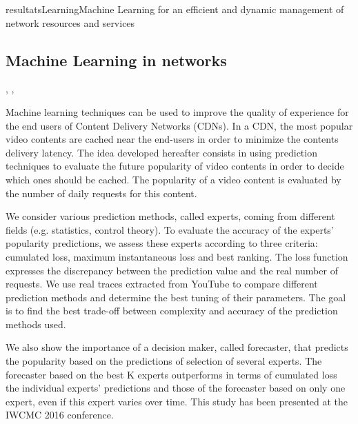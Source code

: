 \documentclass{ra2016}
\begin{document}
\begin{module}{resultats}{Learning}{Machine Learning for an efficient and dynamic management of network resources and services}

\subsection{Machine Learning in networks}
\begin{participants}
,
,
\end{participants}

Machine learning techniques can be used to improve the quality of experience for the end users of Content Delivery Networks (CDNs). In a CDN, the most popular video contents are cached near the end-users in order to minimize the contents delivery latency. The idea developed hereafter consists in using prediction techniques to evaluate the future popularity of video contents in order to decide which ones should be cached. The popularity of a video content is evaluated by the number of daily requests for this content.

We consider various prediction methods, called experts, coming from different fields (e.g. statistics, control theory). To evaluate the accuracy of the experts' popularity predictions, we assess these experts according to three criteria: cumulated loss, maximum instantaneous loss and best ranking. The loss function expresses the discrepancy between the prediction value and the real number of requests. We use real traces extracted from YouTube to compare different prediction methods and determine the best tuning of their parameters. The goal is to find the best trade-off between complexity and accuracy of the prediction methods used.

We also show the importance of a decision maker, called forecaster, that predicts the popularity based on the predictions of selection of several experts. The forecaster based on the best K experts outperforms in terms of cumulated loss the individual experts' predictions and those of the forecaster based on only one expert, even if this expert varies over time. This study has been presented at the IWCMC 2016 conference.


\end{module}
\end{document}
